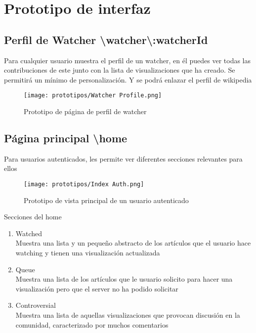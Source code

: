\section{Prototipo de interfaz}

\subsection{Perfil de Watcher \textbackslash watcher\textbackslash:watcherId}
Para cualquier usuario muestra el perfil de un watcher, en él puedes ver todas las contribuciones de este junto con la lista de visualizaciones que ha creado.
Se permitirá un mínimo de personalización. Y se podrá enlazar el perfil de wikipedia

\begin{figure}[H]
    \centering
    \texttt{[image: prototipos/Watcher Profile.png]}
    \caption{Prototipo de página de perfil de watcher}
    \label{PrototipoWatchersProfile}
\end{figure}

\subsection{Página principal \textbackslash home}
Para usuarios autenticados, les permite ver diferentes secciones relevantes para ellos

\begin{figure}[H]
    \centering
    \texttt{[image: prototipos/Index Auth.png]}
    \caption{Prototipo de vista principal de un usuario autenticado}
    \label{PrototipoHomePage}
\end{figure}


Secciones del home
\begin{enumerate}
    \item Watched \\ Muestra una lista y un pequeño abstracto de los artículos que el usuario hace watching y tienen una visualización actualizada
    \item Queue \\ Muestra una lista de los artículos que le usuario solicito para hacer una visualización pero que el server no ha podido solicitar
    \item Controversial \\ Muestra una lista de aquellas visualizaciones que provocan discusión en la comunidad, caracterizado por muchos comentarios
\end{enumerate}

